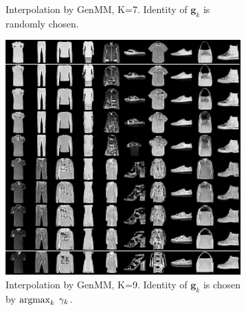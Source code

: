 \begin{figure}[!t]
\begin{subfigure}[b]{0.3\textwidth}
    \caption{Interpolation by GenMM, K=7. Identity of $\bm{g}_k$ is randomly chosen.~~~~~~~~~}\label{fig-interpo-genmm2}
  \end{subfigure}
  \hspace{10pt}
  \begin{subfigure}[b]{0.3\textwidth}
    \centering
    \includegraphics[width=1\linewidth]{images/fashion-mnist/interpolation/interpoFashion_homo_GenMM_K9_map_grid.png}
    \caption{Interpolation by GenMM, K=9. Identity of $\bm{g}_k$ is chosen by $\operatorname{argmax}_{k}\; \gamma_k$.}\label{fig-interpo-genmm3}
  \end{subfigure}
  \vspace{0.22cm}
  \centering
  \captionsetup[subfigure]{justification=centering}
  \begin{subfigure}[b]{0.3\textwidth}
    \centering

\end{subfigure}
\end{figure}
